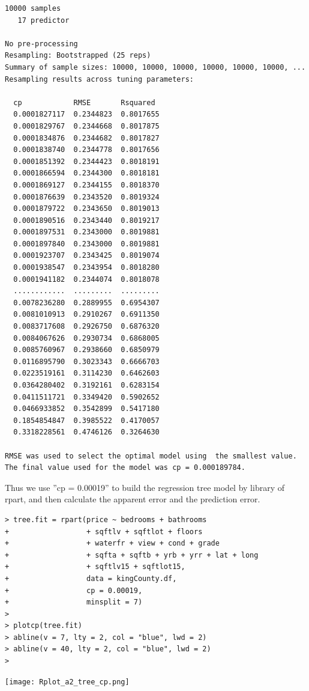 \documentclass{article}%
\begin{document}
\begin{verbatim}
10000 samples
   17 predictor

No pre-processing
Resampling: Bootstrapped (25 reps)
Summary of sample sizes: 10000, 10000, 10000, 10000, 10000, 10000, ...
Resampling results across tuning parameters:

  cp            RMSE       Rsquared
  0.0001827117  0.2344823  0.8017655
  0.0001829767  0.2344668  0.8017875
  0.0001834876  0.2344682  0.8017827
  0.0001838740  0.2344778  0.8017656
  0.0001851392  0.2344423  0.8018191
  0.0001866594  0.2344300  0.8018181
  0.0001869127  0.2344155  0.8018370
  0.0001876639  0.2343520  0.8019324
  0.0001879722  0.2343650  0.8019013
  0.0001890516  0.2343440  0.8019217
  0.0001897531  0.2343000  0.8019881
  0.0001897840  0.2343000  0.8019881
  0.0001923707  0.2343425  0.8019074
  0.0001938547  0.2343954  0.8018280
  0.0001941182  0.2344074  0.8018078
  ............  .........  .........
  0.0078236280  0.2889955  0.6954307
  0.0081010913  0.2910267  0.6911350
  0.0083717608  0.2926750  0.6876320
  0.0084067626  0.2930734  0.6868005
  0.0085760967  0.2938660  0.6850979
  0.0116895790  0.3023343  0.6666703
  0.0223519161  0.3114230  0.6462603
  0.0364280402  0.3192161  0.6283154
  0.0411511721  0.3349420  0.5902652
  0.0466933852  0.3542899  0.5417180
  0.1854854847  0.3985522  0.4170057
  0.3318228561  0.4746126  0.3264630

RMSE was used to select the optimal model using  the smallest value.
The final value used for the model was cp = 0.000189784.
\end{verbatim}
Thus we use ''cp = 0.00019'' to build the regression tree model by library of rpart, and then calculate the apparent error and the prediction error.
\begin{verbatim}
> tree.fit = rpart(price ~ bedrooms + bathrooms
+                  + sqftlv + sqftlot + floors
+                  + waterfr + view + cond + grade
+                  + sqfta + sqftb + yrb + yrr + lat + long
+                  + sqftlv15 + sqftlot15,
+                  data = kingCounty.df,
+                  cp = 0.00019,
+                  minsplit = 7)
>
> plotcp(tree.fit)
> abline(v = 7, lty = 2, col = "blue", lwd = 2)
> abline(v = 40, lty = 2, col = "blue", lwd = 2)
>
\end{verbatim}
\texttt{[image: Rplot\_a2\_tree\_cp.png]}
\end{document}
